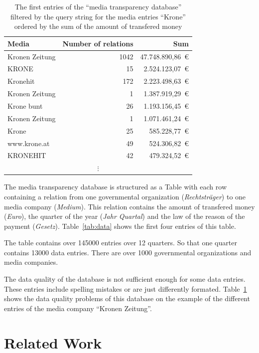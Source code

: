 \documentclass{acmsiggraph}               %
\begin{document}
\begin{table}[!htb]
  \begin{center}
    \begin{tabular}{lrr}
    \toprule
    Media&Number of relations&Sum\\
    \midrule
    Kronen Zeitung&1042&47.748.890,86~\euro\\
    KRONE&15&2.524.123,07~\euro\\
    Kronehit&172&2.223.498,63~\euro\\
    Kronen Zeitung&1&1.387.919,29~\euro\\
    Krone bunt&26&1.193.156,45~\euro\\
    Kronen Zeitung&1&1.071.461,24~\euro\\
    Krone&25&585.228,77~\euro\\
    www.krone.at&49&524.306,82~\euro\\
    KRONEHIT&42&479.324,52~\euro\\
    \multicolumn{3}{c}{$\vdots$}
    \end{tabular}
  \end{center}
  \caption{The first entries of the ``media transparency database'' filtered by the query string for the media entries ``Krone'' ordered by the sum of the amount of transfered money}
  \label{tab:krone}
\end{table}

The media transparency database is structured as a Table with each row containing a relation from one governmental organization (\emph{Rechtstr{\"a}ger}) to one media company (\emph{Medium}). This relation contains the amount of transfered money (\emph{Euro}), the quarter of the year (\emph{Jahr Quartal}) and the law of the reason of the payment (\emph{Gesetz}). Table~\ref{tab:data} shows the first four entries of this table. 
\par
The table contains over 145000 entries over 12 quarters. So that one quarter contains 13000 data entries. There are over 1000 governmental organizations and media companies.
\par
The data quality of the database is not sufficient enough for some data entries. These entries include spelling mistakes or are just differently formated. Table~\ref{tab:krone} shows the data quality problems of this database on the example of the different entries of the media company ``Kronen Zeitung''.


\section{Related Work} %
\label{sec:related_work}
\end{document}
